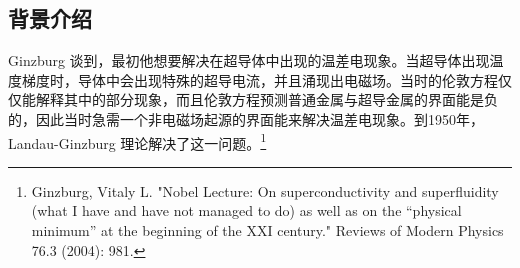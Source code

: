 
\begin{issues}
\issueTODO
\end{issues}

\subsection{背景介绍}
Ginzburg 谈到，最初他想要解决在超导体中出现的温差电现象。当超导体出现温度梯度时，导体中会出现特殊的超导电流，并且涌现出电磁场。当时的伦敦方程仅仅能解释其中的部分现象，而且伦敦方程预测普通金属与超导金属的界面能是负的，因此当时急需一个非电磁场起源的界面能来解决温差电现象。到1950年，Landau-Ginzburg 理论解决了这一问题。\footnote{Ginzburg, Vitaly L. "Nobel Lecture: On superconductivity and superfluidity (what I have and have not managed to do) as well as on the “physical minimum” at the beginning of the XXI century." Reviews of Modern Physics 76.3 (2004): 981.}
